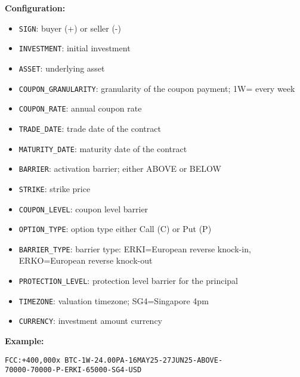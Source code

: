 \documentclass{article}
\begin{document}
\textbf{Configuration:}
\begin{itemize}
    \item \texttt{SIGN}: buyer (+) or seller (-)
    \item \texttt{INVESTMENT}: initial investment
    \item \texttt{ASSET}: underlying asset
    \item \texttt{COUPON\_GRANULARITY}: granularity of the coupon payment; 1W= every week
    \item \texttt{COUPON\_RATE}: annual coupon rate
    \item \texttt{TRADE\_DATE}: trade date of the contract
    \item \texttt{MATURITY\_DATE}: maturity date of the contract
    \item \texttt{BARRIER}: activation barrier; either ABOVE or BELOW
    \item \texttt{STRIKE}: strike price
    \item \texttt{COUPON\_LEVEL}: coupon level barrier
    \item \texttt{OPTION\_TYPE}: option type either Call (C) or Put (P)
    \item \texttt{BARRIER\_TYPE}: barrier type: ERKI=European reverse knock-in, ERKO=European reverse knock-out
    \item \texttt{PROTECTION\_LEVEL}: protection level barrier for the principal
    \item \texttt{TIMEZONE}: valuation timezone; SG4=Singapore 4pm
    \item \texttt{CURRENCY}: investment amount currency
\end{itemize}

\textbf{Example:} 
\begin{small}
\texttt{FCC:+400,000x BTC-1W-24.00PA-16MAY25-27JUN25-ABOVE-}\\
\texttt{70000-70000-P-ERKI-65000-SG4-USD}
\end{small}
\end{document}
